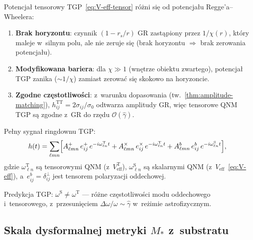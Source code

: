 \begin{remark}\label{rem:tensor-vs-RW}
Potencja\l{} tensorowy TGP~\eqref{eq:V-eff-tensor}
r\'o\.zni si\k{e} od potencja\l{}u Regge'a--Wheelera:
\begin{enumerate}[nosep]
  \item \textbf{Brak horyzontu}: czynnik $(1-r_s/r)$ GR zast\k{a}piony
    przez $1/\chi(r)$, kt\'ory maleje w~silnym polu, ale nie zeruje
    si\k{e} (brak horyzontu $\Rightarrow$ brak zerowania potencja\l{}u).
  \item \textbf{Modyfikowana bariera}: dla $\chi \gg 1$
    (wn\k{e}trze obiektu zwartego), potencja\l{} TGP
    zanika ($\sim 1/\chi$) zamiast zerowa\'c si\k{e} skokowo
    na horyzoncie.
  \item \textbf{Zgodne cz\k{e}stotliwo\'sci}:
    z~warunku dopasowania (tw.~\ref{thm:amplitude-matching}),
    $h_{ij}^{\mathrm{TT}} = 2\sigma_{ij}/\sigma_0$
    odtwarza amplitudy GR, wi\k{e}c tensorowe QNM TGP
    s\k{a} zgodne z~GR do rz\k{e}du $\mathcal{O}(\hat\gamma)$.
\end{enumerate}
\end{remark}

\begin{remark}%
\label{rem:observable-ringdown}
Pe\l{}ny sygna\l{} ringdownu TGP:
\begin{equation}\label{eq:full-ringdown-signal}
  h(t) = \sum_{\ell mn}
  \Bigl[
    A_{\ell mn}^{+}\,e_{ij}^{+}\,e^{-i\omega_{\ell n}^{\mathrm{T}} t}
    + A_{\ell mn}^{\times}\,e_{ij}^{\times}\,e^{-i\omega_{\ell n}^{\mathrm{T}} t}
    + A_{\ell mn}^{b}\,e_{ij}^{b}\,e^{-i\omega_{\ell n}^{\mathrm{S}} t}
  \Bigr],
\end{equation}
gdzie $\omega_{\ell n}^{\mathrm{T}}$ s\k{a} tensorowymi QNM
(z~$V_{\mathrm{eff}}^{\mathrm{T}}$),
$\omega_{\ell n}^{\mathrm{S}}$ s\k{a} skalarnymi QNM
(z~$V_{\mathrm{eff}}$~\eqref{eq:V-eff}),
a~$e_{ij}^{b} = \delta_{ij}^{\perp}$ jest tensorem
polaryzacji oddechowej.

Predykcja TGP: \textbf{$\omega^{\mathrm{S}} \neq \omega^{\mathrm{T}}$}
--- r\'o\.zne cz\k{e}stotliwo\'sci modu oddechowego
i~tensorowego, z~przesuni\k{e}ciem
$\Delta\omega/\omega \sim \hat\gamma$ w~re\.zimie
astrofizycznym.
\end{remark}

\subsection{Skala dysformalnej metryki $M_*$ z~substratu}%
\label{ssec:Mstar-from-substrate}

